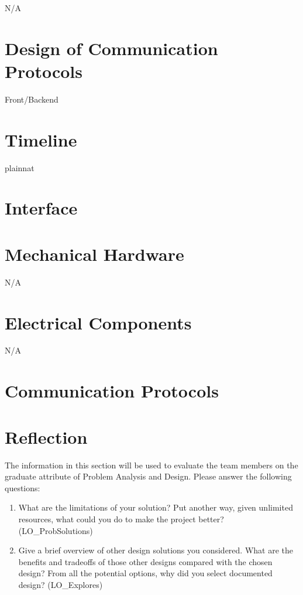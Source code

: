 \documentclass[12pt, titlepage]{article}
\begin{document}
N/A

\section{Design of Communication Protocols}


Front/Backend

\section{Timeline}


 {plainnat}


\newpage{}

\appendix

\section{Interface}


\section{Mechanical Hardware}

N/A

\section{Electrical Components}

N/A

\section{Communication Protocols}

\section{Reflection}

The information in this section will be used to evaluate the team members on the
graduate attribute of Problem Analysis and Design.  Please answer the following questions:

\begin{enumerate}
  \item What are the limitations of your solution?  Put another way, given
  unlimited resources, what could you do to make the project better? (LO\_ProbSolutions)
  \item Give a brief overview of other design solutions you considered.  What
  are the benefits and tradeoffs of those other designs compared with the chosen
  design?  From all the potential options, why did you select documented design?
  (LO\_Explores)
\end{enumerate}
\end{document}
